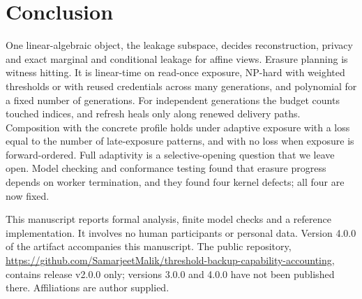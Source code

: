 \documentclass[pdflatex,sn-mathphys-num]{sn-jnl}
\theoremstyle{plain}
\theoremstyle{definition}
\begin{document}
\section{Conclusion}
One linear-algebraic object, the leakage subspace, decides reconstruction, privacy and exact marginal and conditional leakage for affine views. Erasure planning is witness hitting. It is linear-time on read-once exposure, NP-hard with weighted thresholds or with reused credentials across many generations, and polynomial for a fixed number of generations. For independent generations the budget counts touched indices, and refresh heals only along renewed delivery paths. Composition with the concrete profile holds under adaptive exposure with a loss equal to the number of late-exposure patterns, and with no loss when exposure is forward-ordered. Full adaptivity is a selective-opening question that we leave open. Model checking and conformance testing found that erasure progress depends on worker termination, and they found four kernel defects; all four are now fixed.


\backmatter
{}
This manuscript reports formal analysis, finite model checks and a reference implementation. It involves no human participants or personal data. Version 4.0.0 of the artifact accompanies this manuscript. The public repository, \url{https://github.com/SamarjeetMalik/threshold-backup-capability-accounting}, contains release v2.0.0 only; versions 3.0.0 and 4.0.0 have not been published there. Affiliations are author supplied.
\end{document}
